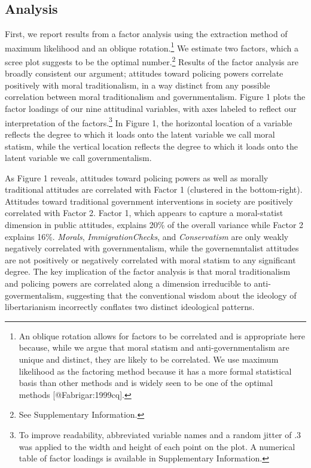 \documentclass[12pt,]{article}
\begin{document}
\subsection{Analysis}\label{analysis}

First, we report results from a factor analysis using the extraction
method of maximum likelihood and an oblique
rotation.\footnote{An oblique rotation allows for factors to be correlated and is appropriate here because, while we argue that moral statism and anti-governmentalism are unique and distinct, they are likely to be correlated. We use maximum likelihood as the factoring method because it has a more formal statistical basis than other methods and is widely seen to be one of the optimal methods [@Fabrigar:1999cq].}
We estimate two factors, which a scree plot suggests to be the optimal
number.\footnote{See Supplementary Information.} Results of the factor
analysis are broadly consistent our argument; attitudes toward policing
powers correlate positively with moral traditionalism, in a way distinct
from any possible correlation between moral traditionalism and
governmentalism. Figure 1 plots the factor loadings of our nine
attitudinal variables, with axes labeled to reflect our interpretation
of the
factors.\footnote{To improve readability, abbreviated variable names and a random jitter of .3 was applied to the width and height of each point on the plot. A numerical table of factor loadings is available in Supplementary Information.}
In Figure 1, the horizontal location of a variable reflects the degree
to which it loads onto the latent variable we call moral statism, while
the vertical location reflects the degree to which it loads onto the
latent variable we call governmentalism.

As Figure 1 reveals, attitudes toward policing powers as well as morally
traditional attitudes are correlated with Factor 1 (clustered in the
bottom-right). Attitudes toward traditional government interventions in
society are positively correlated with Factor 2. Factor 1, which appears
to capture a moral-statist dimension in public attitudes, explains 20\%
of the overall variance while Factor 2 explains 16\%. \emph{Morals},
\emph{ImmigrationChecks}, and \emph{Conservatism} are only weakly
negatively correlated with governmentalism, while the governemntalist
attitudes are not positively or negatively correlated with moral statism
to any significant degree. The key implication of the factor analysis is
that moral traditionalism and policing powers are correlated along a
dimension irreducible to anti-govermentalism, suggesting that the
conventional wisdom about the ideology of libertarianism incorrectly
conflates two distinct ideological patterns.
\end{document}
